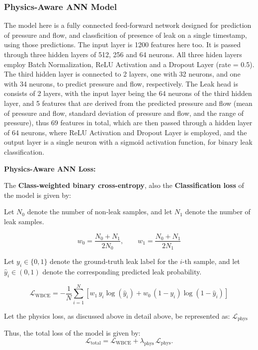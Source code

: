 \documentclass[final,5p,times,twocolumn,authoryear]{elsarticle}
\begin{document}
\subsubsection{Physics-Aware ANN Model}

The model here is a fully connected feed-forward network designed for prediction of pressure and flow, and classficition of presence of leak on a single timestamp, using those predictions. The input layer is 1200 features here too. It is passed through three hidden layers of 512, 256 and 64 neurons. All three hiden layers employ Batch Normalization, ReLU Activation and a Dropout Layer (rate  = 0.5). The third hidden layer is connected to 2 layers, one with 32 neurons, and one with 34 neurons, to predict pressure and flow, respectively. The Leak head is consists of 2 layers, with the input layer being the 64 neurons of the third hidden layer, and 5 features that are derived from the predicted pressure and flow (mean of pressure and flow, standard deviation of pressure and flow, and the range of pressure), thus 69 features in total, which are then passed through a hidden layer of 64 neurons, where ReLU Activation and Dropout Layer is employed, and the output layer is a single neuron with a sigmoid activation function, for binary leak classification.

\vspace{0.5cm}

\textbf{Physics-Aware ANN Loss: }

The \textbf{Class-weighted binary cross-entropy}, also the \textbf{Classification loss} of the model is given by:

Let \(N_0\) denote the number of non-leak samples, and  
let \(N_1\) denote the number of leak samples.

\[
w_0 = \frac{N_0 + N_1}{2 N_0}, \qquad
w_1 = \frac{N_0 + N_1}{2 N_1}
\]

Let \(y_i \in \{0,1\}\) denote the ground-truth leak label for the \(i\)-th sample,  
and let \(\hat{y}_i \in (0,1)\) denote the corresponding predicted leak probability.

\[
\mathcal{L}_{\text{WBCE}}
= - \frac{1}{N} \sum_{i=1}^{N}
\left[
w_1 \, y_i \log(\hat{y}_i)
+ w_0 \, (1 - y_i) \log(1 - \hat{y}_i)
\right]
\]

Let the physics loss, as discussed above in detail above, be represented as:
$\mathcal{L}_{\mathrm{phys}}$

Thus, the total loss of the model is given by:
\[
\mathcal{L}_{\mathrm{total}}
=
\mathcal{L}_{\mathrm{WBCE}}
+
\lambda_{\mathrm{phys}} \, \mathcal{L}_{\mathrm{phys}}.
\]
\end{document}

